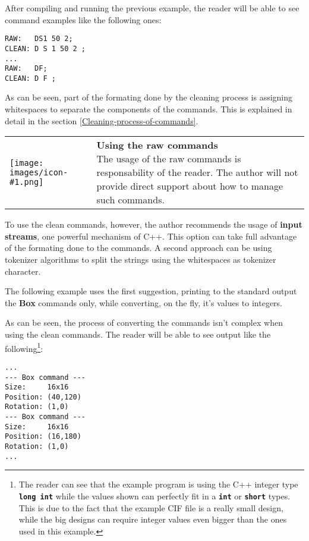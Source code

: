 \documentclass[11pt,twoside,openany,x11names,svgnames]{memoir}
\makeatletter
\newcommand{\IconNote}[3]
{
	\begin{table}[ht]
	\begin{tabular}{ lm{\dimexpr\textwidth-8\tabcolsep-\wd0}@{}}
		\toprule
		\texttt{[image: images/icon-\#1.png]}
		&
		\parbox[t]{155mm}{
		\textbf{#2} \\
		#3
		}
	\end{tabular}
\end{table}
}
\makeatother
\begin{document}


After compiling and running the previous example, the reader will be able to see command examples like the following ones:

\begin{lstlisting}[frame=single,style=CPPStyle]
RAW:   DS1 50 2;
CLEAN: D S 1 50 2 ;
...
RAW:   DF;
CLEAN: D F ;
\end{lstlisting}

As can be seen, part of the formating done by the cleaning process is assigning whitespaces to separate the components of the commands. This is explained in detail in the section \ref{Cleaning-process-of-commands}.

\IconNote
	{warning}
	{Using the raw commands}
	{The usage of the raw commands is responsability of the reader. The author will not provide direct support about how to manage such commands.}

To use the clean commands, however, the author recommends the usage of \textbf{input streams}, one powerful mechanism of C++. This option can take full advantage of the formating done to the commands. A second approach can be using tokenizer algorithms to split the strings using the whitespaces as tokenizer character.

The following example uses the first suggestion, printing to the standard output the \textbf{Box} commands only, while converting, on the fly, it's values to integers.



As can be seen, the process of converting the commands isn't complex when using the clean commands. The reader will be able to see output like the following\footnote{The reader can see that the example program is using the C++ integer type \textbf{\texttt{long int}} while the values shown can perfectly fit in a \textbf{\texttt{int}} or \textbf{\texttt{short}} types. This is due to the fact that the example CIF file is a really small design, while the big designs can require integer values even bigger than the ones used in this example.}:

\begin{lstlisting}[frame=single,style=CPPStyle]
...
--- Box command ---
Size:     16x16
Position: (40,120)
Rotation: (1,0)
--- Box command ---
Size:     16x16
Position: (16,180)
Rotation: (1,0)
...
\end{lstlisting}
\end{document}
